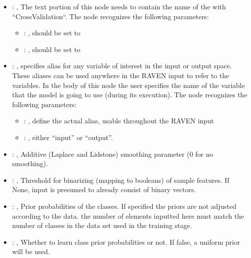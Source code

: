 \begin{itemize}
    \item {}: , 
      The text portion of this node needs to contain the name of the  with
               ``CrossValidation``.
      The  node recognizes the following parameters:
        \begin{itemize}
          \item {}: , 
            should be set to 
          \item {}: , 
            should be set to 
      \end{itemize}

    \item {}: , 
      specifies alias for         any variable of interest in the input or output space. These
      aliases can be used anywhere in the RAVEN input to         refer to the variables. In the body
      of this node the user specifies the name of the variable that the model is going to use
      (during its execution).
      The  node recognizes the following parameters:
        \begin{itemize}
          \item {}: , 
            define the actual alias, usable throughout the RAVEN input
          \item {}: , 
            either ``input'' or ``output''.
      \end{itemize}

    \item {}: , 
      Additive (Laplace and Lidstone) smoothing parameter (0 for no smoothing).

    \item {}: , 
      Threshold for binarizing (mapping to booleans) of sample features. If None,
      input is presumed to already consist of binary vectors.

    \item {}: , 
      Prior probabilities of the classes. If specified the priors are
      not adjusted according to the data. \nb the number of elements inputted here must
      match the number of classes in the data set used in the training stage.

    \item {}: , 
      Whether to learn class prior probabilities or not. If false, a uniform
      prior will be used.
  \end{itemize}


